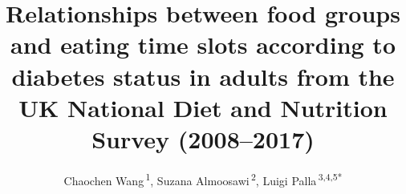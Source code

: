 \documentclass[utf8]{frontiersSCNS}
\def\Authors{
  Chaochen Wang\,\textsuperscript{1},
  Suzana Almoosawi\,\textsuperscript{2},
  Luigi Palla\,\textsuperscript{3,4,5*}}
\def\firstAuthorLast{WANG {et~al.}}
\begin{document}
\onecolumn
{}

\title[Food groups choice and time of consumption.]{Relationships
between food groups and eating time slots according to diabetes status
in adults from the UK National Diet and Nutrition Survey (2008--2017)}
\author[\firstAuthorLast]{\Authors}
\address{} %
\correspondance{} %

\extraAuth{}%


\maketitle
\end{document}

